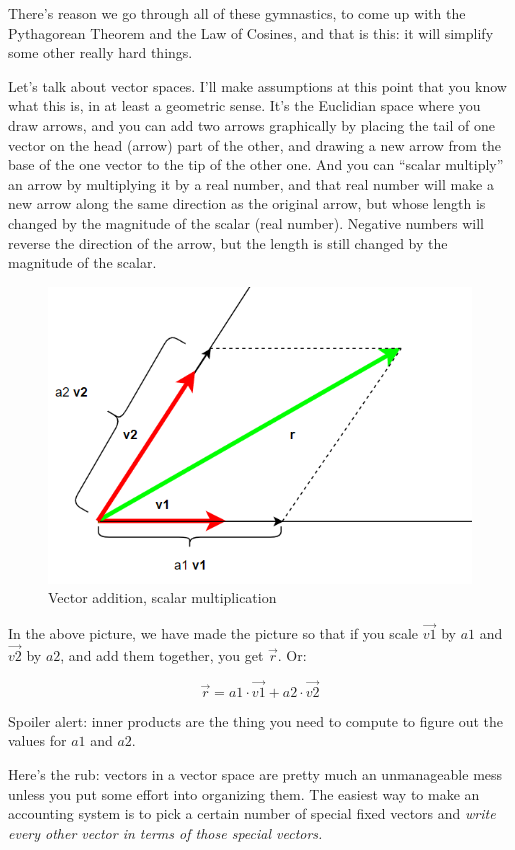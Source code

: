 \documentclass[
]{book}
\begin{document}
There's reason we go through all of these gymnastics, to come up with the Pythagorean Theorem and the Law of Cosines, and that is this: it will simplify some other really hard things.

Let's talk about vector spaces. I'll make assumptions at this point that you know what this is, in at least a geometric sense. It's the Euclidian space where you draw arrows, and you can add two arrows graphically by placing the tail of one vector on the head (arrow) part of the other, and drawing a new arrow from the base of the one vector to the tip of the other one. And you can ``scalar multiply'' an arrow by multiplying it by a real number, and that real number will make a new arrow along the same direction as the original arrow, but whose length is changed by the magnitude of the scalar (real number). Negative numbers will reverse the direction of the arrow, but the length is still changed by the magnitude of the scalar.

\begin{figure}

{\centering \includegraphics[width=0.75\linewidth,height=0.75\textheight]{images/parallelogram-decomposition} 

}

\caption{Vector addition, scalar multiplication}\label{fig:unnamed-chunk-15}
\end{figure}

In the above picture, we have made the picture so that if you scale \(\vec{v1}\) by \(a1\) and \(\vec{v2}\) by \(a2\), and add them together, you get \(\vec{r}\). Or:

\[\vec{r} = a1\cdot\vec{v1} + a2\cdot\vec{v2}\]

Spoiler alert: inner products are the thing you need to compute to figure out the values for \(a1\) and \(a2\).

Here's the rub: vectors in a vector space are pretty much an unmanageable mess unless you put some effort into organizing them. The easiest way to make an accounting system is to pick a certain number of special fixed vectors and \emph{write every other vector in terms of those special vectors.}
\end{document}
